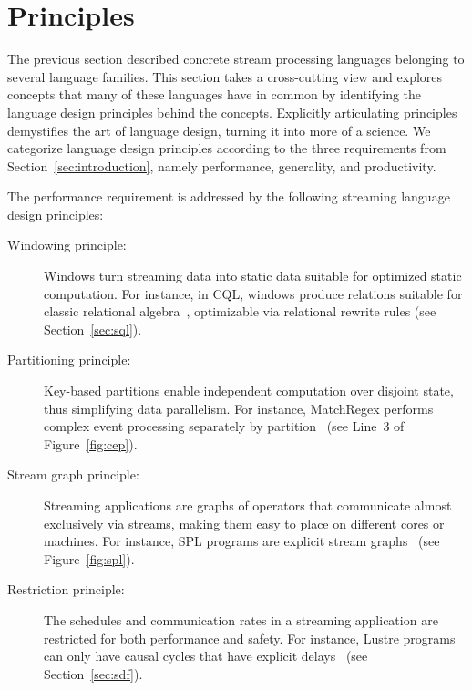 \section{Principles}\label{sec:principles}

The previous section described concrete stream processing languages
belonging to several language families. This section takes a
cross-cutting view and explores concepts that many of these languages
have in common by identifying the language design principles behind
the concepts.  Explicitly articulating principles demystifies the art
of language design, turning it into more of a science. We categorize
language design principles according to the three requirements from
Section~\ref{sec:introduction}, namely performance, generality, and
productivity.

The performance requirement is addressed by the following streaming
language design principles:
\begin{description}
  \item[Windowing principle:] Windows turn streaming data into static
    data suitable for optimized static computation.  For instance, in
    CQL, windows produce relations suitable for classic relational
    algebra~\cite{arasu_babu_widom_2006}, optimizable via relational
    rewrite rules (see Section~\ref{sec:sql}).
  \item[Partitioning principle:] Key-based partitions enable
    independent computation over disjoint state, thus simplifying data
    parallelism. For instance, MatchRegex performs complex event
    processing separately by partition~\cite{hirzel_2012} (see Line~3
    of Figure~\ref{fig:cep}).
  \item[Stream graph principle:] Streaming applications are graphs of
    operators that communicate almost exclusively via streams, making
    them easy to place on different cores or machines. For instance,
    SPL programs are explicit stream
    graphs~\cite{hirzel_schneider_gedik_2017} (see
    Figure~\ref{fig:spl}).
  \item[Restriction principle:] The schedules and communication rates
    in a streaming application are restricted for both performance and
    safety. For instance, Lustre programs can only have causal cycles
    that have explicit delays~\cite{lustre_1987} (see
    Section~\ref{sec:sdf}).
\end{description}

